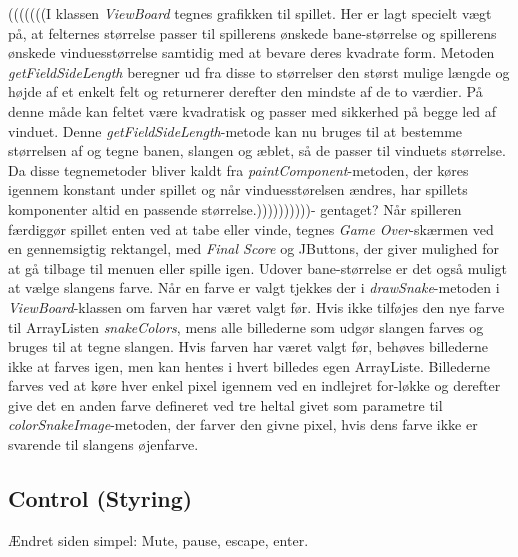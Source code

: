 (((((((I klassen \textit{ViewBoard} tegnes grafikken til spillet. Her er lagt specielt vægt på, at felternes størrelse passer til spillerens ønskede bane-størrelse og spillerens ønskede vinduesstørrelse samtidig med at bevare deres kvadrate form. Metoden \textit{getFieldSideLength} beregner ud fra disse to størrelser den størst mulige længde og højde af et enkelt felt og returnerer derefter den mindste af de to værdier. På denne måde kan feltet være kvadratisk og passer med sikkerhed på begge led af vinduet. Denne \textit{getFieldSideLength}-metode kan nu bruges til at bestemme størrelsen af og tegne banen, slangen og æblet, så de passer til vinduets størrelse. Da disse tegnemetoder bliver kaldt fra \textit{paintComponent}-metoden, der køres igennem konstant under spillet og når vinduesstørelsen ændres, har spillets komponenter altid en passende størrelse.))))))))))- gentaget?
Når spilleren færdiggør spillet enten ved at tabe eller vinde, tegnes \textit{Game Over}-skærmen ved en gennemsigtig rektangel, med \textit{Final Score} og JButtons, der giver mulighed for at gå tilbage til menuen eller spille igen.
Udover bane-størrelse er det også muligt at vælge slangens farve. Når en farve er valgt tjekkes der i \textit{drawSnake}-metoden i \textit{ViewBoard}-klassen om farven har været valgt før. Hvis ikke tilføjes den nye farve til ArrayListen \textit{snakeColors}, mens alle billederne som udgør slangen farves og bruges til at tegne slangen. Hvis farven har været valgt før, behøves billederne ikke at farves igen, men kan hentes i hvert billedes egen ArrayListe. Billederne farves ved at køre hver enkel pixel igennem ved en indlejret for-løkke og derefter give det en anden farve defineret ved tre heltal givet som parametre til \textit{colorSnakeImage}-metoden, der farver den givne pixel, hvis dens farve ikke er svarende til slangens øjenfarve.

\subsection{Control (Styring)}
Ændret siden simpel: Mute, pause, escape, enter.

